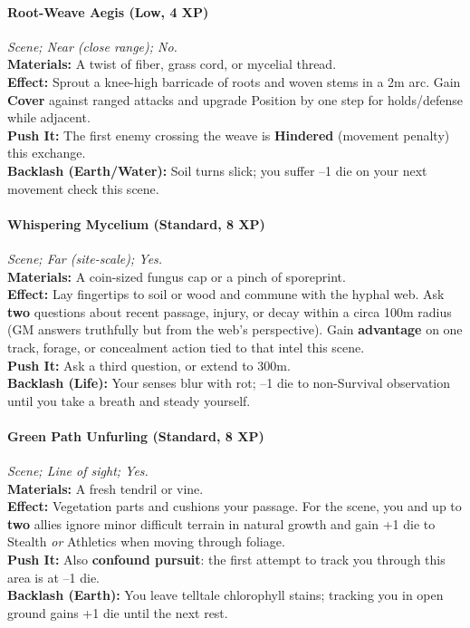 \paragraph{Root-Weave Aegis (Low, 4 XP)} \emph{Scene; Near (close range); No.}\\
\textbf{Materials:} A twist of fiber, grass cord, or mycelial thread.\\
\textbf{Effect:} Sprout a knee-high barricade of roots and woven stems in a 2m arc. Gain \textbf{Cover} against ranged attacks and upgrade Position by one step for holds/defense while adjacent.\\
\textbf{Push It:} The first enemy crossing the weave is \textbf{Hindered} (movement penalty) this exchange.\\
\textbf{Backlash (Earth/Water):} Soil turns slick; you suffer --1 die on your next movement check this scene.

\paragraph{Whispering Mycelium (Standard, 8 XP)} \emph{Scene; Far (site-scale); Yes.}\\
\textbf{Materials:} A coin-sized fungus cap or a pinch of sporeprint.\\
\textbf{Effect:} Lay fingertips to soil or wood and commune with the hyphal web. Ask \textbf{two} questions about recent passage, injury, or decay within a circa 100m radius (GM answers truthfully but from the web’s perspective). Gain \textbf{advantage} on one track, forage, or concealment action tied to that intel this scene.\\
\textbf{Push It:} Ask a third question, or extend to 300m.\\
\textbf{Backlash (Life):} Your senses blur with rot; --1 die to non-Survival observation until you take a breath and steady yourself.

\paragraph{Green Path Unfurling (Standard, 8 XP)} \emph{Scene; Line of sight; Yes.}\\
\textbf{Materials:} A fresh tendril or vine.\\
\textbf{Effect:} Vegetation parts and cushions your passage. For the scene, you and up to \textbf{two} allies ignore minor difficult terrain in natural growth and gain +1 die to Stealth \emph{or} Athletics when moving through foliage.\\
\textbf{Push It:} Also \textbf{confound pursuit}: the first attempt to track you through this area is at --1 die.\\
\textbf{Backlash (Earth):} You leave telltale chlorophyll stains; tracking you in open ground gains +1 die until the next rest.

